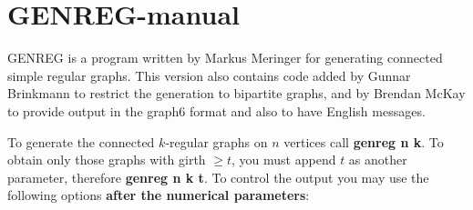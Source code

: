 \documentclass[11pt]{article}
\begin{document}
\section*{GENREG-manual}

GENREG is a program written by Markus Meringer for generating
connected simple regular graphs.  This version also contains
code added by Gunnar Brinkmann to restrict the generation to
bipartite graphs, and by Brendan McKay to provide output in
the graph6 format and also to have English messages.

To generate the connected $k$-regular graphs on $n$ vertices
call {\bf genreg n k}. To obtain only those graphs with girth 
$\ge t$, you must append $t$ as another parameter, therefore
{\bf genreg n k t}. To control the output you may use the
following options \textbf{after the numerical parameters}:
\end{document}
